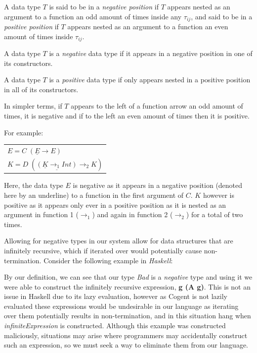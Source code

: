 \theoremstyle{definition}
\begin{definition}
    A data type $T$ is said to be in a \textit{negative position} if $T$ appears nested as an argument
    to a function an odd amount of times inside any $\tau_{ij}$, and said to be in a \textit{positive position}
    if $T$ appears nested as an argument to a function an even amount of times inside $\tau_{ij}$.
\end{definition}

\theoremstyle{definition}
\begin{definition}
    A data type $T$ is a \textit{negative} data type if it appears in a negative position 
    in one of its constructors.
\end{definition}

\theoremstyle{definition}
\begin{definition}
    A data type $T$ is a \textit{positive} data type if only appears nested in a positive position
    in all of its constructors.
\end{definition}

In simpler terms, if $T$ appears to the left of a function arrow an odd amount of times, it is negative and if
to the left an even amount of times then it is positive.

For example:

\begin{center}
    \begin{tabular}{l}
        $E = C\; (\underline{E} \rightarrow E)$ \\
        $K = D\; (\underline{(\underline{K} \rightarrow_1 Int)} \rightarrow_2 K)$
    \end{tabular} 
\end{center}

Here, the data type $E$ is negative as it appears in a negative position (denoted here by an underline)
to a function in the first argument of $C$.
$K$ however is positive as it appears only ever in a positive position as it is nested as an argument
in function 1 ($\rightarrow_1$) and again in function 2 ($\rightarrow_2$) for a total of two times.

Allowing for negative types in our system allow for data structures that are infinitely recursive,
which if iterated over would potentially cause non-termination. Consider
the following example in \textit{Haskell}:



By our definition, we can see that our type \textit{Bad} is a \textit{negative} type and using it we were able
to construct the infinitely recursive expression, \textbf{g (A g)}.
This is not an issue in Haskell due to its lazy evaluation,
however as Cogent is not lazily evaluated these expressions would be undesirable in
our language as iterating over them potentially results in non-termination, and in this
situation hang when \textit{infiniteExpression} is constructed.
Although this example was constructed maliciously, situations may arise where
programmers may accidentally construct such an expression, so we must seek a way to
eliminate them from our language.

